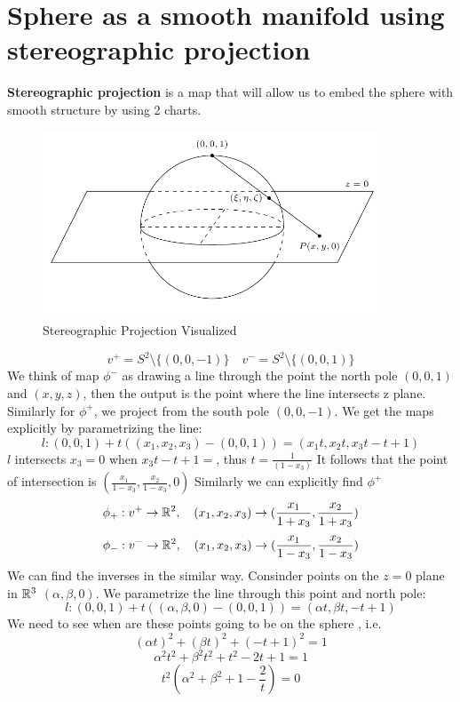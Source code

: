 \documentclass[11pt,a4paper]{report}
\begin{document}
\section{Sphere as a smooth manifold using stereographic projection}
\textbf{Stereographic projection} is a map that will allow us to embed the sphere with smooth structure by using 2 charts.
\newline
\begin{figure}[h] \label{ster_proj}
    \centering
    \includegraphics[width=0.90\textwidth]{stereographic_projection.png}
    \caption{Stereographic Projection Visualized}
\end{figure}
$$ v^{+} = S^2 \setminus \{(0,0,-1)\} \quad v^{-} = S^2 \setminus \{ (0,0,1) \} $$
We think of map $\phi^{-}$ as drawing a line through the point the north pole $(0,0,1)$ and $(x,y,z)$, then the output is the point where the line intersects z plane.
Similarly for $\phi^{+}$, we project from the south pole $(0,0,-1)$. We get the maps explicitly by parametrizing the line:
$$ l: (0,0,1) + t ((x_1,x_2,x_3) - (0,0,1)) =  (x_1 t,x_2 t, x_3 t-t+1) $$
$l$ intersects $x_3=0$ when $x_3t-t+1=$, thus $t = \frac{1}{(1-x_3)}$ It follows that the point of intersection is $(\frac{x_1}{1-x_3},\frac{x_2}{1-x_3},0)$
Similarly we can explicitly find $\phi^{+}$
$$ \phi_{+}: v^{+} \to \mathbb{R}^2, \quad (x_1,x_2,x_3) \to (\frac{x_1}{1+x_3}, \frac{x_2}{1+x_3} )$$
$$ \phi_{-}: v^{-} \to \mathbb{R}^2, \quad (x_1,x_2,x_3) \to (\frac{x_1}{1-x_3}, \frac{x_2}{1-x_3} )$$
We can find the inverses in the similar way.
Consinder points on the $z=0$ plane in $\mathbb{R}^3$ $(\alpha, \beta, 0)$. We parametrize the line through this point and north pole:
$$ l: (0,0,1) + t((\alpha, \beta, 0 ) - (0,0,1)) = (\alpha t, \beta t, -t +1)$$
We need to see when are these points going to be on the sphere , i.e.
$$ (\alpha t)^2  + (\beta t)^2 + (-t +1)^2 = 1 $$
$$ \alpha^2 t^2 + \beta^2 t^2 + t^2 - 2t + 1 = 1 $$
$$ t^2 (\alpha^2 + \beta^2 +1 - \frac{2}{t} ) = 0 $$
\end{document}
